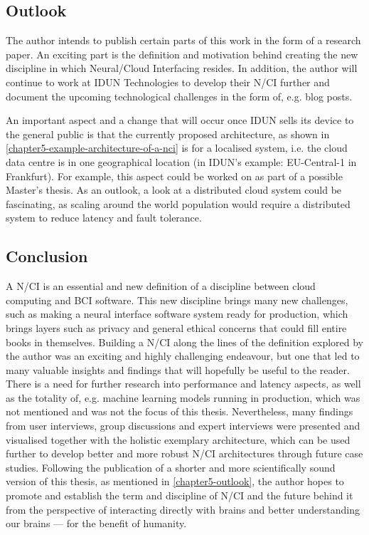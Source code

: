 \subsection{Outlook}
\label{chapter5-outlook}

The author intends to publish certain parts of this work in the form of a research paper. An exciting part is the definition and motivation behind creating the new discipline in which Neural/Cloud Interfacing resides. In addition, the author will continue to work at IDUN Technologies to develop their N/CI further and document the upcoming technological challenges in the form of, e.g. blog posts.

An important aspect and a change that will occur once IDUN sells its device to the general public is that the currently proposed architecture, as shown in \autoref{chapter5-example-architecture-of-a-nci} is for a localised system, i.e. the cloud data centre is in one geographical location (in IDUN's example: EU-Central-1 in Frankfurt). For example, this aspect could be worked on as part of a possible Master's thesis. As an outlook, a look at a distributed cloud system could be fascinating, as scaling around the world population would require a distributed system to reduce latency and fault tolerance.

\subsection{Conclusion}
\label{chapter5-conclusion}

A N/CI is an essential and new definition of a discipline between cloud computing and BCI software. This new discipline brings many new challenges, such as making a neural interface software system ready for production, which brings layers such as privacy and general ethical concerns that could fill entire books in themselves. Building a N/CI along the lines of the definition explored by the author was an exciting and highly challenging endeavour, but one that led to many valuable insights and findings that will hopefully be useful to the reader. There is a need for further research into performance and latency aspects, as well as the totality of, e.g. machine learning models running in production, which was not mentioned and was not the focus of this thesis. Nevertheless, many findings from user interviews, group discussions and expert interviews were presented and visualised together with the holistic exemplary architecture, which can be used further to develop better and more robust N/CI architectures through future case studies. Following the publication of a shorter and more scientifically sound version of this thesis, as mentioned in \autoref{chapter5-outlook}, the author hopes to promote and establish the term and discipline of N/CI and the future behind it from the perspective of interacting directly with brains and better understanding our brains — for the benefit of humanity.

